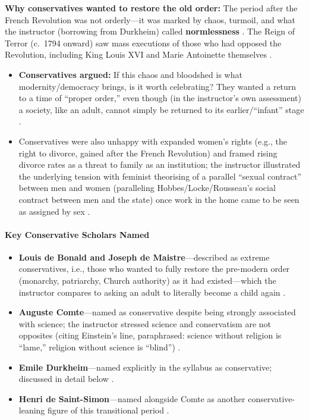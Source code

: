 \begin{CriticalPoint}
\textbf{Why conservatives wanted to restore the old order:} The period after the French Revolution was not orderly---it was marked by chaos, turmoil, and what the instructor (borrowing from Durkheim) called \textbf{normlessness} . The Reign of Terror (c.~1794 onward) saw mass executions of those who had opposed the Revolution, including King Louis XVI and Marie Antoinette themselves .
\begin{itemize}
    \item \textbf{Conservatives argued:} If this chaos and bloodshed is what modernity/democracy brings, is it worth celebrating?  They wanted a return to a time of ``proper order,'' even though (in the instructor's own assessment) a society, like an adult, cannot simply be returned to its earlier/``infant'' stage .
    \item Conservatives were also unhappy with expanded women's rights (e.g., the right to divorce, gained after the French Revolution) and framed rising divorce rates as a threat to family as an institution; the instructor illustrated the underlying tension with feminist theorising of a parallel ``sexual contract'' between men and women (paralleling Hobbes/Locke/Rousseau's social contract between men and the state) once work in the home came to be seen as assigned by sex .
\end{itemize}
\end{CriticalPoint}

\paragraph{Key Conservative Scholars Named}

\begin{GovtPolicy}
\begin{itemize}
    \item \textbf{Louis de Bonald and Joseph de Maistre}---described as extreme conservatives, i.e., those who wanted to fully restore the pre-modern order (monarchy, patriarchy, Church authority) as it had existed---which the instructor compares to asking an adult to literally become a child again .
    \item \textbf{Auguste Comte}---named as conservative despite being strongly associated with science; the instructor stressed science and conservatism are not opposites (citing Einstein's line, paraphrased: science without religion is ``lame,'' religion without science is ``blind'') .
    \item \textbf{Emile Durkheim}---named explicitly in the syllabus as conservative; discussed in detail below .
    \item \textbf{Henri de Saint-Simon}---named alongside Comte as another conservative-leaning figure of this transitional period .
\end{itemize}
\end{GovtPolicy}

